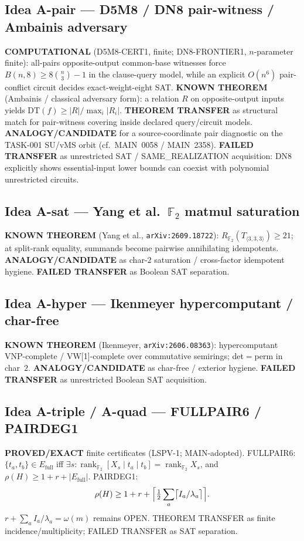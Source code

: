 \documentclass[11pt]{article}
\begin{document}
\subsection*{Idea A-pair --- D5M8 / DN8 pair-witness / Ambainis adversary}
\textbf{COMPUTATIONAL} (D5M8-CERT1, finite; DN8-FRONTIER1, $n$-parameter finite):
all-pairs opposite-output common-base witnesses force
$B(n,8)\ge 8\binom{n}{3}-1$ in the clause-query model, while an explicit
$O(n^6)$ pair-conflict circuit decides exact-weight-eight SAT.
\textbf{KNOWN THEOREM} (Ambainis / classical adversary form): a relation $R$ on
opposite-output inputs yields
$\mathrm{DT}(f)\ge |R|/\max_i|R_i|$.
\textbf{THEOREM TRANSFER} as structural match for pair-witness covering inside
declared query/circuit models.
\textbf{ANALOGY/CANDIDATE} for a source-coordinate pair diagnostic on the
TASK-001 SU/vMS orbit (cf.\ MAIN~0058 / MAIN~2358).
\textbf{FAILED TRANSFER} as unrestricted SAT / SAME\_REALIZATION acquisition:
DN8 explicitly shows essential-input lower bounds can coexist with polynomial
unrestricted circuits.

\subsection*{Idea A-sat --- Yang et al.\ $\mathbb F_2$ matmul saturation}
\textbf{KNOWN THEOREM} (Yang et al., \texttt{arXiv:2609.18722}):
$R_{\mathbb F_2}(T_{\langle 3,3,3\rangle})\ge 21$; at split-rank equality,
summands become pairwise annihilating idempotents.
\textbf{ANALOGY/CANDIDATE} as char-$2$ saturation / cross-factor idempotent
hygiene. \textbf{FAILED TRANSFER} as Boolean SAT separation.

\subsection*{Idea A-hyper --- Ikenmeyer hypercomputant / char-free}
\textbf{KNOWN THEOREM} (Ikenmeyer, \texttt{arXiv:2606.08363}): hypercomputant
VNP-complete / VW[1]-complete over commutative semirings; det$=$perm in char~$2$.
\textbf{ANALOGY/CANDIDATE} as char-free / exterior hygiene.
\textbf{FAILED TRANSFER} as unrestricted Boolean SAT acquisition.

\subsection*{Idea A-triple / A-quad --- FULLPAIR6 / PAIRDEG1}
\textbf{PROVED/EXACT} finite certificates (LSPV-1; MAIN-adopted).
FULLPAIR6: $\{t_a,t_b\}\in E_{\mathrm{full}}$ iff $\exists s:
\operatorname{rank}_{\mathbb F_2}[X_s\mid t_a\mid t_b]=\operatorname{rank}_{\mathbb F_2}X_s$,
and $\rho(H)\ge 1+r+|E_{\mathrm{full}}|$. PAIRDEG1:
\[
\rho(H)\ge 1+r+\Bigl\lceil\tfrac12\sum_a\bigl\lceil I_a/\lambda_a\bigr\rceil\Bigr\rceil.
\]
$r+\sum_a I_a/\lambda_a=\omega(m)$ remains OPEN. THEOREM TRANSFER as finite
incidence/multiplicity; FAILED TRANSFER as SAT separation.
\end{document}
